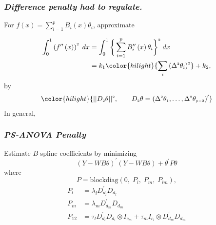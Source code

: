 \documentclass[12pt]{beamer}
\newcommand{\newthought}[1]{{\small \color{hilight} {#1}}}
\newcommand{\newmaththought}[1]{{ \color{hilight} {#1}}}
\newcommand{\ms}{\scriptscriptstyle}
\begin{document}
\begin{frame}
\frametitle{\emph{Difference penalty had to regulate.}}

For $f\left(x\right)=\sum \limits_{i=1}^{p} B_{i}\left(x\right) \theta_{i}$, approximate

\begin{align}
\begin{split}
\int_0^1 \left(f^{\prime \prime}\left(x\right)\right)^{\ms 2} \;dx &= \int_0^1 \bigg\{ \sum \limits_{i=1}^{p} B^{\prime \prime}_{i}\left(x\right) \theta_{i} \bigg\}^{\ms 2} \;dx \\ 
&= k_1 \newmaththought{\sum_i \left( \Delta^{\ms 2} \theta_i \right)^{\ms 2}} + k_2, 
\end{split}
\end{align}
\noindent
by
\[
\newmaththought{\vert \vert D_{\ms 2} \theta \vert \vert^{\ms 2}, \qquad  D_{\ms 2} \theta= \left( \Delta^{\ms 2}\theta_{\ms 1},\dots,\Delta^{\ms 2}\theta_{\ms{p-2}} \right)^\prime }
\]
In general, 
\framebox{\newthought{approximate} $\newmaththought{\int \limits_{\ms 0}^{\ms 1} \big(f^{\ms{\left(d\right)}}\big)^{\ms 2}\;dx}$ \newthought{with} $\newmaththought{\vert \vert D_{\ms d} \theta \vert \vert^{\ms 2} }$ }
\end{frame}


\begin{frame}
\frametitle{\emph{PS-ANOVA Penalty}}

Estimate $B$-spline coefficients by minimizing 
\begin{equation*}
\left(Y-WB\theta\right)^\prime \left(Y-WB\theta\right) + \theta^\prime P \theta
\end{equation*}
\noindent
where
\begin{equation} \label{eq:PSANOVA-penalty}
P = \mbox{blockdiag}\left(0,\; P_l, \; P_m, \; P_{lm}\right),
\end{equation}
\begin{align*}
P_{\ms l} &= \lambda_l D_{\ms{d_l}}^\prime D_{\ms{d_l}}\\
P_{\ms m} &= \lambda_m D_{\ms{d_m}}^\prime D_{\ms{d_m}}\\
P_{\ms{12}} &= \tau_l D_{\ms{d_l}}^\prime D_{\ms{d_l}} \otimes I_{\ms{c_m}} + \tau_m I_{\ms{c_l}} \otimes D_{\ms{d_m}}^\prime D_{\ms{d_m}} 
\end{align*}

\end{frame}
\end{document}
